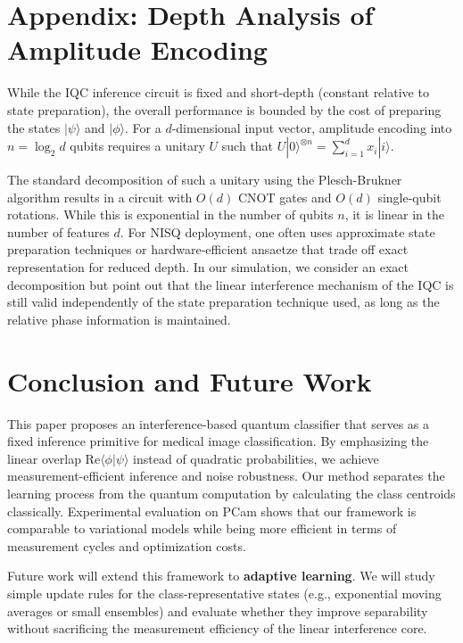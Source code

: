 \documentclass[conference]{IEEEtran}
\begin{document}
\section*{Appendix: Depth Analysis of Amplitude Encoding}

While the IQC inference circuit is fixed and short-depth (constant relative to state preparation), the overall performance is bounded by the cost of preparing the states $|\psi\rangle$ and $|\phi\rangle$. For a $d$-dimensional input vector, amplitude encoding into $n = \log_2 d$ qubits requires a unitary $U$ such that $U|0\rangle^{\otimes n} = \sum_{i=1}^d x_i |i\rangle$.

The standard decomposition of such a unitary using the Plesch-Brukner algorithm \cite{plesch2011quantum} results in a circuit with $O(d)$ CNOT gates and $O(d)$ single-qubit rotations. While this is exponential in the number of qubits $n$, it is linear in the number of features $d$. For NISQ deployment, one often uses approximate state preparation techniques or hardware-efficient ansaetze that trade off exact representation for reduced depth. In our simulation, we consider an exact decomposition but point out that the linear interference mechanism of the IQC is still valid independently of the state preparation technique used, as long as the relative phase information is maintained.

\section{Conclusion and Future Work}

This paper proposes an interference-based quantum classifier that serves as a fixed inference primitive for medical image classification. By emphasizing the linear overlap $\mathrm{Re}\langle \phi | \psi \rangle$ instead of quadratic probabilities, we achieve measurement-efficient inference and noise robustness. Our method separates the learning process from the quantum computation by calculating the class centroids classically. Experimental evaluation on PCam shows that our framework is comparable to variational models while being more efficient in terms of measurement cycles and optimization costs.

Future work will extend this framework to \textbf{adaptive learning}. We will study simple update rules for the class-representative states (e.g., exponential moving averages or small ensembles) and evaluate whether they improve separability without sacrificing the measurement efficiency of the linear interference core.
\end{document}
